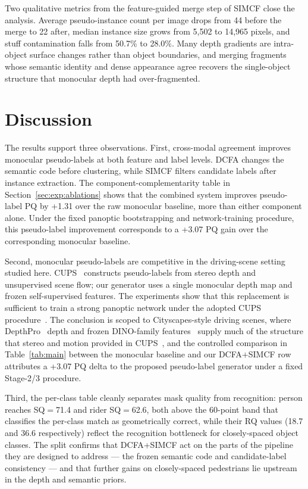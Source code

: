 \documentclass[10pt,twocolumn,letterpaper]{article}
\begin{document}
Two qualitative metrics from the feature-guided merge step of SIMCF close the analysis. Average pseudo-instance count per image drops from 44 before the merge to 22 after, median instance size grows from 5{,}502 to 14{,}965 pixels, and stuff contamination falls from 50.7\% to 28.0\%. Many depth gradients are intra-object surface changes rather than object boundaries, and merging fragments whose semantic identity and dense appearance agree recovers the single-object structure that monocular depth had over-fragmented.


\section{Discussion}
\label{sec:discussion}

The results support three observations. First, cross-modal agreement improves monocular pseudo-labels at both feature and label levels. DCFA changes the semantic code before clustering, while SIMCF filters candidate labels after instance extraction. The component-complementarity table in Section~\ref{sec:exp:ablations} shows that the combined system improves pseudo-label PQ by +1.31 over the raw monocular baseline, more than either component alone. Under the fixed panoptic bootstrapping and network-training procedure, this pseudo-label improvement corresponds to a +3.07 PQ gain over the corresponding monocular baseline.

Second, monocular pseudo-labels are competitive in the driving-scene setting studied here. CUPS~\cite{hahn2025cups} constructs pseudo-labels from stereo depth and unsupervised scene flow; our generator uses a single monocular depth map and frozen self-supervised features. The experiments show that this replacement is sufficient to train a strong panoptic network under the adopted CUPS procedure~\cite{hahn2025cups}. The conclusion is scoped to Cityscapes-style driving scenes, where DepthPro~\cite{bochkovskii2024depthpro} depth and frozen DINO-family features~\cite{oquab2024dinov2,simeoni2025dinov3} supply much of the structure that stereo and motion provided in CUPS~\cite{hahn2025cups}, and the controlled comparison in Table~\ref{tab:main} between the monocular baseline and our DCFA$+$SIMCF row attributes a +3.07 PQ delta to the proposed pseudo-label generator under a fixed Stage-2/3 procedure.

Third, the per-class table cleanly separates mask quality from recognition: person reaches SQ$=$71.4 and rider SQ$=$62.6, both above the 60-point band that classifies the per-class match as geometrically correct, while their RQ values (18.7 and 36.6 respectively) reflect the recognition bottleneck for closely-spaced object classes. The split confirms that DCFA+SIMCF act on the parts of the pipeline they are designed to address --- the frozen semantic code and candidate-label consistency --- and that further gains on closely-spaced pedestrians lie upstream in the depth and semantic priors.
\end{document}
